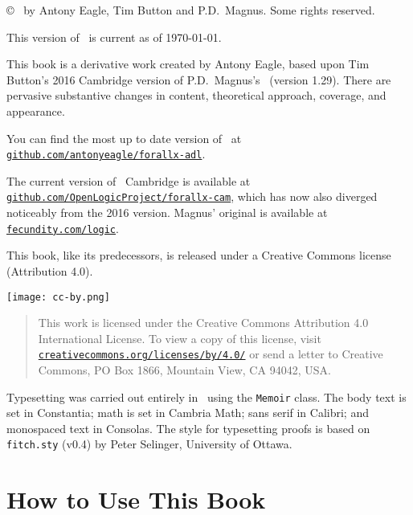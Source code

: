 {\copyright\  by Antony Eagle, Tim Button and P.D.\ Magnus. Some rights reserved.

This version of \forallxadl\ is current as of \today.

\medskip

This book is a derivative work created by Antony Eagle, based upon Tim Button's 2016 Cambridge version of P.D.\ Magnus's \forallx\ (version 1.29). There are pervasive substantive changes in content, theoretical approach, coverage, and appearance. 

You can find the most up to date version of \forallxadl\ at \href{https://github.com/antonyeagle/forallx-adl}{\nolinkurl{github.com/antonyeagle/forallx-adl}}. 

The current version of \forallx\ Cambridge is available at \href{https://github.com/OpenLogicProject/forallx-cam}{\nolinkurl{github.com/OpenLogicProject/forallx-cam}}, which has now also diverged noticeably from the 2016 version. Magnus' original is available at \href{http://fecundity.com/logic}{\nolinkurl{fecundity.com/logic}}. 

This book, like its predecessors, is released under a Creative Commons license (Attribution 4.0).\medskip 

\begin{center}
	\texttt{[image: cc-by.png]} 
\end{center}

\begin{quote}
	{\small This work is licensed under the Creative Commons Attribution 4.0 International License. To view a copy of this license, visit \href{https://creativecommons.org/licenses/by/4.0/}{\nolinkurl{creativecommons.org/licenses/by/4.0/}} or send a letter to Creative Commons, PO Box 1866, Mountain View, CA 94042, USA.} 
\end{quote} \medskip


\vfill

Typesetting was carried out entirely in \XeLaTeX\ using the \texttt{Memoir} class. The body text is set in Constantia; math is set in Cambria Math; sans serif in Calibri; and monospaced text in Consolas. The style for typesetting proofs is based on \texttt{fitch.sty} (v0.4) by Peter Selinger, University of Ottawa.

\newpage
\tableofcontents*\newpage
\listoffigures*

\chapter*{How to Use This Book}

}
